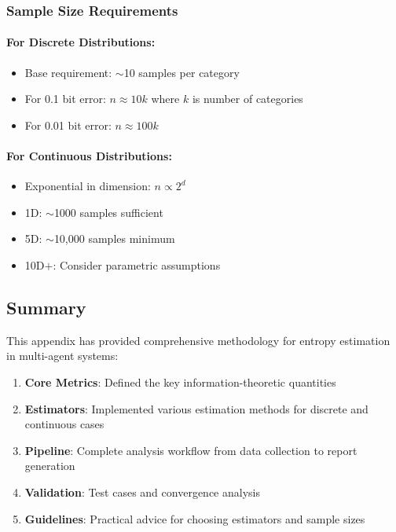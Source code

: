 \documentclass[10pt, letterpaper]{article}
\begin{document}
\subsubsection{Sample Size Requirements}

\paragraph{For Discrete Distributions:}
\begin{itemize}
    \item Base requirement: $\sim$10 samples per category
    \item For 0.1 bit error: $n \approx 10k$ where $k$ is number of categories
    \item For 0.01 bit error: $n \approx 100k$
\end{itemize}

\paragraph{For Continuous Distributions:}
\begin{itemize}
    \item Exponential in dimension: $n \propto 2^d$
    \item 1D: $\sim$1000 samples sufficient
    \item 5D: $\sim$10,000 samples minimum
    \item 10D$+$: Consider parametric assumptions
\end{itemize}

\subsection{Summary}

This appendix has provided comprehensive methodology for entropy estimation in multi-agent systems:
\begin{enumerate}
    \item \textbf{Core Metrics}: Defined the key information-theoretic quantities
    \item \textbf{Estimators}: Implemented various estimation methods for discrete and continuous cases
    \item \textbf{Pipeline}: Complete analysis workflow from data collection to report generation
    \item \textbf{Validation}: Test cases and convergence analysis
    \item \textbf{Guidelines}: Practical advice for choosing estimators and sample sizes
\end{enumerate}
\end{document}
